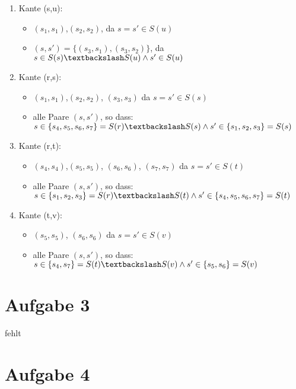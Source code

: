 \documentclass[a4paper,10pt,oneside,leqno]{scrartcl}
\begin{document}
\begin{enumerate}
 \item Kante (s,u):
  \begin{itemize}
        \item $(s_1,s_1)$,$(s_2,s_2)$, da $s=s'\in S(u)$
        \item $(s,s')=\{(s_3,s_1),(s_3,s_2)\}$, da $s\in S(s)\textbackslash S(u) \wedge s'\in S(u)$
  \end{itemize}
\item Kante (r,s):
  \begin{itemize}
        \item $(s_1,s_1)$,$(s_2,s_2)$, $(s_3,s_3)$ da $s=s'\in S(s)$
        \item alle Paare $(s,s')$, so dass: $s\in\{s_4,s_5,s_6,s_7\} = S(r)\textbackslash S(s) \wedge s'\in 
        \{s_1,s_2,s_3\} = S(s)$
   \end{itemize}
\item Kante (r,t):
  \begin{itemize}
        \item $(s_4,s_4)$,$(s_5,s_5)$, $(s_6,s_6)$, $(s_7,s_7)$ da $s=s'\in S(t)$
        \item alle Paare $(s,s')$, so dass: $s\in \{s_1,s_2,s_3\} = S(r)\textbackslash S(t) \wedge s'\in 
        \{s_4,s_5,s_6,s_7\} = S(t)$
       \end{itemize}
\item Kante (t,v):
  \begin{itemize}
        \item $(s_5,s_5)$, $(s_6,s_6)$ da $s=s'\in S(v)$
        \item alle Paare $(s,s')$, so dass: $s\in \{s_4,s_7\} = S(t)\textbackslash S(v) \wedge s'\in 
        \{s_5,s_6\} = S(v)$
       \end{itemize}
\end{enumerate}
\section*{Aufgabe 3}
fehlt

\section*{Aufgabe 4}
\end{document}
